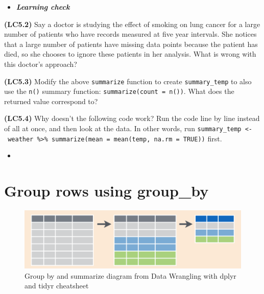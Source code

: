 \documentclass[12pt,]{krantz}
\makeatletter
\newenvironment{Shaded}{\begin{snugshade}}{\end{snugshade}}
\newcommand{\KeywordTok}[1]{\textcolor[rgb]{0.27,0.27,0.27}{\textbf{#1}}}
\newcommand{\DataTypeTok}[1]{\textcolor[rgb]{0.27,0.27,0.27}{#1}}
\newcommand{\StringTok}[1]{\textcolor[rgb]{0.5,0.5,0.5}{#1}}
\newcommand{\OtherTok}[1]{\textcolor[rgb]{0.37,0.37,0.37}{#1}}
\newcommand{\OperatorTok}[1]{\textcolor[rgb]{0.43,0.43,0.43}{\textbf{#1}}}
\newcommand{\NormalTok}[1]{#1}
\newenvironment{kframe}{%
\medskip{}
\setlength{\fboxsep}{.8em}
 \def\at@end@of@kframe{}%
 \ifinner\ifhmode%
  \def\at@end@of@kframe{\end{minipage}}%
  \begin{minipage}{\columnwidth}%
 \fi\fi%
 \def\FrameCommand##1{\hskip\@totalleftmargin \hskip-\fboxsep
 \colorbox{shadecolor}{##1}\hskip-\fboxsep
     \hskip-\linewidth \hskip-\@totalleftmargin \hskip\columnwidth}%
 \MakeFramed {\advance\hsize-\width
   \@totalleftmargin\z@ \linewidth\hsize
   \@setminipage}}%
 {\par\unskip\endMakeFramed%
 \at@end@of@kframe}
\renewenvironment{Shaded}{\begin{kframe}}{\end{kframe}}
\newenvironment{rmdblock}[1]
  {\begin{shaded*}
  \begin{itemize}
  \renewcommand{\labelitemi}{
    \raisebox{-.7\height}[0pt][0pt]{
    }
  }
  \item
  }
  {
  \end{itemize}
  \end{shaded*}
  }
\newenvironment{learncheck}
  {\begin{rmdblock}{warning}}
  {\end{rmdblock}}
\theoremstyle{definition}
\theoremstyle{definition}
\theoremstyle{definition}
\theoremstyle{remark}
\makeatother
\begin{document}
\begin{learncheck}
\textbf{\emph{Learning check}}
\end{learncheck}

\textbf{(LC5.2)} Say a doctor is studying the effect of smoking on lung
cancer for a large number of patients who have records measured at five
year intervals. She notices that a large number of patients have missing
data points because the patient has died, so she chooses to ignore these
patients in her analysis. What is wrong with this doctor's approach?

\textbf{(LC5.3)} Modify the above \texttt{summarize} function to create
\texttt{summary\_temp} to also use the \texttt{n()} summary function:
\texttt{summarize(count\ =\ n())}. What does the returned value
correspond to?

\textbf{(LC5.4)} Why doesn't the following code work? Run the code line
by line instead of all at once, and then look at the data. In other
words, run
\texttt{summary\_temp\ \textless{}-\ weather\ \%\textgreater{}\%\ summarize(mean\ =\ mean(temp,\ na.rm\ =\ TRUE))}
first.

\begin{Shaded}
\end{Shaded}

\begin{learncheck}

\end{learncheck}

\section{Group rows using group\_by}\label{groupby}

\begin{figure}

{\centering \includegraphics[width=\textwidth]{images/group_summary} 

}

\caption{Group by and summarize diagram from Data Wrangling with dplyr and tidyr cheatsheet}\label{fig:groupsummarize}
\end{figure}
\end{document}
